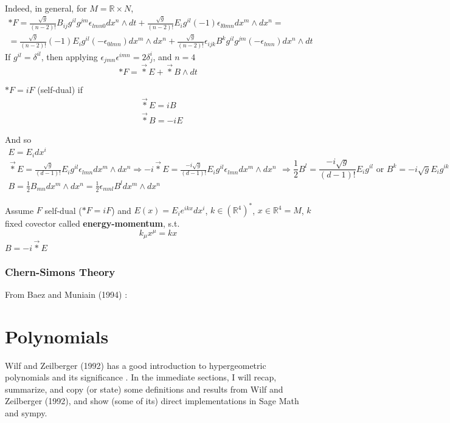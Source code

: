 \documentclass[10pt]{amsart}
\begin{document}
\begin{multicols*}{2}
Indeed, in general, for $M = \mathbb{R}\times N$, 
\[
\begin{gathered}
  *F = \frac{ \sqrt{g}}{ (n-2)!} B_{ij} g^{il}g^{jm} \epsilon_{lmn0} dx^n \wedge dt + \frac{\sqrt{g}}{(n-2)!} E_i g^{il} (-1) \epsilon_{l0mn} dx^m \wedge dx^n = \\
  =  \frac{\sqrt{g}}{ (n-2)!}(-1)E_i g^{il} (-\epsilon_{0lmn}) dx^m \wedge dx^n + \frac{\sqrt{g}}{(n-2)!} \epsilon_{ijk} B^k g^{il} g^{jm} (-\epsilon_{lmn})dx^n \wedge dt
\end{gathered}
\]
If $g^{il}= \delta^{il}$, then applying $\epsilon_{jmn}\epsilon^{imn} = 2\delta^i_j$, and $n=4$
\[
*F = \vec{*}E + \vec{*}B \wedge dt
\]

$*F = iF$ (self-dual) if 
\[
\begin{aligned}
  & \vec{*} E= iB \\ 
  & \vec{*} B= -i E
\end{aligned}
\]

And so 
\[
\begin{gathered}
  E = E_i dx^i \\ 
  \vec{*} E = \frac{ \sqrt{g}}{ (d-1)!} E_i g^{il} \epsilon_{lmn} dx^m \wedge dx^n \Longrightarrow -i \vec{*} E = \frac{-i\sqrt{g}}{ (d-1)!} E_i g^{il} \epsilon_{lmn} dx^m \wedge dx^n \\ 
  B = \frac{1}{2} B_{mn} dx^m \wedge dx^n = \frac{1}{2} \epsilon_{mnl} B^l dx^m \wedge dx^n 
\end{gathered} \Longrightarrow \frac{1}{2} B^l = \frac{-i \sqrt{g}}{ (d-1)!} E_i g^{il} \text{ or } B^k = -i \sqrt{g} E_i g^{ik}
\]


Assume $F$ self-dual ($*F = iF$) and $E(x) = E_i e^{ikx} dx^i$, $k \in (\mathbb{R}^4)^*$, $x\in \mathbb{R}^4 = M$, $k$ fixed covector called \textbf{energy-momentum}, s.t. 
\[
k_{\mu} x^{\mu} = kx
\]
$B= -i \vec{*} E$




\section{Chern-Simons Theory}

From Baez and Muniain (1994) \cite{JBaezJMuniain1994}: 




\part{Polynomials}

Wilf and Zeilberger (1992) has a good introduction to hypergeometric polynomials and its significance \cite{HWilfDZeilberger1992}.  In the immediate sections, I will recap, summarize, and copy (or state) some definitions and results from  Wilf and Zeilberger (1992), and show (some of its) direct implementations in Sage Math and sympy.    









\end{multicols*}
\end{document}
